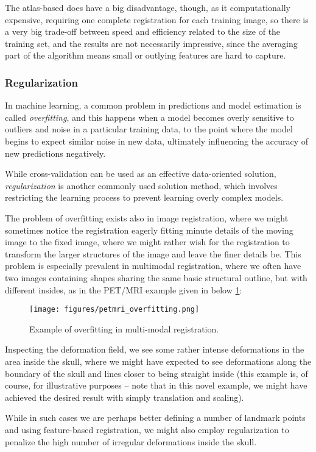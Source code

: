 The atlas-based does have a big disadvantage, though, as it computationally
expensive, requiring one complete registration for each training image, so there
is a very big trade-off between speed and efficiency related to the size of the
training set, and the results are not necessarily impressive, since the
averaging part of the algorithm means small or outlying features are hard to
capture.

\subsubsection{Regularization}
\label{sec:regularization}

In machine learning, a common problem in predictions and model estimation is
called \textit{overfitting}, and this happens when a model becomes overly
sensitive to outliers and noise in a particular training data, to the point
where the model begins to expect similar noise in new data, ultimately
influencing the accuracy of new predictions negatively.

While cross-validation can be used as an effective data-oriented solution,
\textit{regularization} is another commonly used solution method, which involves
restricting the learning process to prevent learning overly complex models.

\smallskip

The problem of overfitting exists also in image registration, where we might
sometimes notice the registration eagerly fitting minute details of the moving
image to the fixed image, where we might rather wish for the registration to
transform the larger structures of the image and leave the finer details be.
This problem is especially prevalent in multimodal registration, where we often
have two images containing shapes sharing the same basic structural outline, but
with different insides, as in the PET/MRI example given in below
\cref{fig:overfitting}:

\begin{figure}[H]
  \texttt{[image: figures/petmri\_overfitting.png]}
  \caption{{\footnotesize Example of overfitting in multi-modal registration.}}
  \label{fig:overfitting}
\end{figure}
\vspace{-0.5cm}

Inspecting the deformation field, we see some rather intense deformations in the
area inside the skull, where we might have expected to see deformations along
the boundary of the skull and lines closer to being straight inside (this
example is, of course, for illustrative purposes -- note that in this novel
example, we might have achieved the desired result with simply translation and
scaling).

While in such cases we are perhaps better defining a number of landmark points
and using feature-based registration, we might also employ regularization to
penalize the high number of irregular deformations inside the skull.

\sectend
